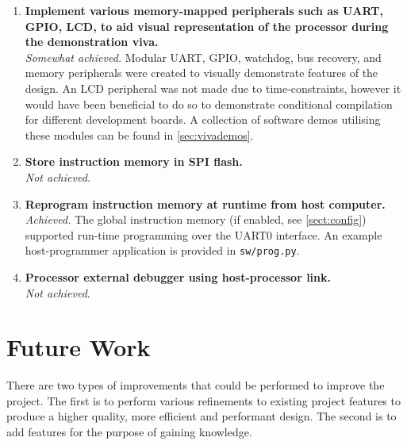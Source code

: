 \begin{enumerate}[leftmargin=2\parindent, label=\bfseries ED\arabic*]
    \item{\textbf{Implement various memory-mapped peripherals such as UART, GPIO, LCD, to aid visual representation of the processor during the demonstration viva.}\\
    \textit{Somewhat achieved.} Modular UART, GPIO, watchdog, bus recovery, and memory peripherals were created to visually demonstrate features of the design. An LCD peripheral was not made due to time-constraints, however it would have been beneficial to do so to demonstrate conditional compilation for different development boards. A collection of software demos utilising these modules can be found in \cref{sec:vivademos}.}
    
    \item{\textbf{Store instruction memory in SPI flash.}\\
    \textit{Not achieved.}}
    
    \item{\textbf{Reprogram instruction memory at runtime from host computer.}\\
    \textit{Achieved.} The global instruction memory (if enabled, see \cref{sect:config}) supported run-time programming over the UART0 interface. An example host-programmer application is provided in \verb|sw/prog.py|.}
    
    \item{\textbf{Processor external debugger using host-processor link.}\\
    \textit{Not achieved}.}
\end{enumerate}


\section{Future Work}
There are two types of improvements that could be performed to improve the project. The first is to perform various refinements to existing project features to produce a higher quality, more efficient and performant design.  The second is to add features for the purpose of gaining knowledge.

